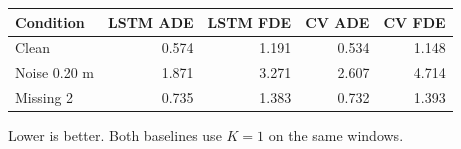 \centering\small
\begin{tabular}{lrrrr}\toprule Condition & LSTM ADE & LSTM FDE & CV ADE & CV FDE \\ \midrule
Clean & 0.574 & 1.191 & 0.534 & 1.148 \\
Noise 0.20 m & 1.871 & 3.271 & 2.607 & 4.714 \\
Missing 2 & 0.735 & 1.383 & 0.732 & 1.393 \\
\bottomrule\end{tabular}
\par\medskip Lower is better. Both baselines use $K=1$ on the same windows.
